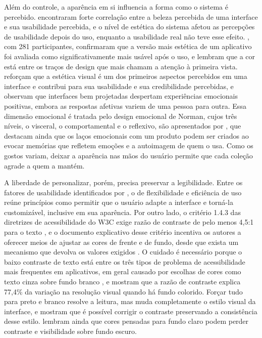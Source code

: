Além do controle, a aparência em si influencia a forma como o sistema é percebido.  encontraram forte correlação entre a
beleza percebida de uma interface e sua usabilidade percebida, e o nível de estética do sistema afetou as percepções de usabilidade depois do uso, enquanto a
usabilidade real não teve esse efeito. , com 281 participantes, confirmaram que a versão mais estética de
um aplicativo foi avaliada como significativamente mais usável após o uso, e lembram que a cor está entre os traços de design que mais chamam a atenção à
primeira vista.  reforçam que a estética visual é um dos primeiros aspectos percebidos em uma interface e contribui para sua usabilidade e
sua credibilidade percebidas, e  observam que interfaces bem projetadas despertam experiências emocionais positivas, embora as respostas
afetivas variem de uma pessoa para outra. Essa dimensão emocional é tratada pelo design emocional de Norman, cujos três níveis, o visceral, o comportamental e
o reflexivo, são apresentados por , que destacam ainda que os laços emocionais com um produto podem ser criados ao evocar
memórias que refletem emoções e a autoimagem de quem o usa. Como os gostos variam, deixar a aparência nas mãos do usuário permite que
cada coleção agrade a quem a mantém.

A liberdade de personalizar, porém, precisa preservar a legibilidade. Entre os fatores de usabilidade identificados por , o de
flexibilidade e eficiência de uso reúne princípios como permitir que o usuário adapte a interface e torná-la customizável, inclusive em sua aparência. Por
outro lado, o critério 1.4.3 das diretrizes de acessibilidade do W3C exige razão de contraste de pelo menos 4,5:1 para o texto
\cite{campbell2024wcag}, e o documento explicativo desse critério incentiva os autores a oferecer meios de ajustar as cores de frente e de fundo, desde que
exista um mecanismo que devolva os valores exigidos \cite{w3c2026contrast}. O cuidado é necessário porque o baixo contraste de texto está entre os três tipos de
problema de acessibilidade mais frequentes em aplicativos, em geral causado por escolhas de cores como texto cinza sobre fundo branco \cite{Chen2022a}, e
 mostram que a razão de contraste explica 77,4\% da variação na resolução visual quando há fundo colorido. Forçar tudo para preto e branco
resolve a leitura, mas muda completamente o estilo visual da interface, e  mostram que é possível corrigir o contraste preservando a
consistência desse estilo.  lembram ainda que cores pensadas para fundo claro podem perder contraste e visibilidade sobre fundo escuro.

